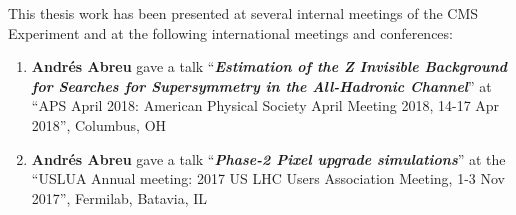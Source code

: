 This thesis work has been presented at several internal meetings of the CMS Experiment and at the following international meetings and conferences:

\begin{enumerate}
	\item{\textbf{Andr\'es Abreu} gave a talk ``\textbf{\textit{Estimation of the Z Invisible Background for Searches for Supersymmetry in the All-Hadronic Channel}}'' at ``APS April 2018: American Physical Society April Meeting 2018, 14-17 Apr 2018'', Columbus, OH}
	\item{\textbf{Andr\'es Abreu} gave a talk ``\textbf{\textit{Phase-2 Pixel upgrade simulations}}'' at the ``USLUA Annual meeting: 2017 US LHC Users Association Meeting, 1-3 Nov 2017'', Fermilab, Batavia, IL}
	
\end{enumerate}


